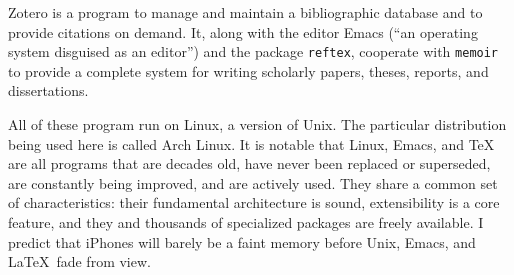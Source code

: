 Zotero is a program to manage and maintain a bibliographic database and to provide citations on demand. It, along with the editor Emacs (``an operating system disguised as an editor'') and the package \texttt{reftex}, cooperate with \texttt{memoir} to provide a complete system for writing scholarly papers, theses, reports, and dissertations.

\begin{center}
  \textbf{\qquad\qquad{}\qquad\qquad{}\qquad\qquad{}\qquad\qquad{}}
\end{center}

All of these program run on Linux, a version of Unix. The particular distribution being used here is called Arch Linux. It is notable that Linux, Emacs, and \TeX  are all programs that are decades old, have never been replaced or superseded, are constantly being improved, and are actively used. They share a common set of characteristics: their fundamental architecture is sound, extensibility is a core feature, and they and thousands of specialized packages are freely available. I predict that iPhones will barely be a faint memory before Unix, Emacs, and \LaTeX fade from view.

